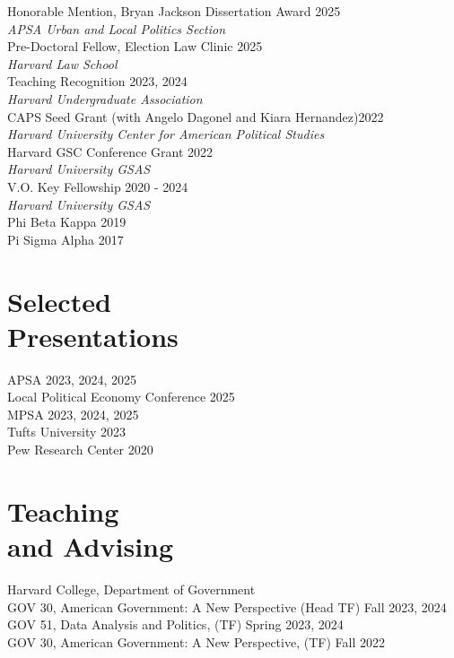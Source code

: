 \documentclass[margin, line]{res}
\begin{document}
\begin{resume}
Honorable Mention, Bryan Jackson Dissertation Award \hfill 2025\\
\hspace*{5mm} \textit{APSA Urban and Local Politics Section} \\
Pre-Doctoral Fellow, Election Law Clinic \hfill 2025\\
\hspace*{5mm} \textit{Harvard Law School}\\
Teaching Recognition \hfill 2023, 2024\\
\hspace*{5mm} \textit{Harvard Undergraduate Association}\\
CAPS Seed Grant (with Angelo Dagonel and Kiara Hernandez)\hfill 2022\\
\hspace*{5mm} \textit{Harvard University Center for American Political Studies}\\
Harvard GSC Conference Grant \hfill 2022\\
\hspace*{5mm} \textit{Harvard University GSAS}\\
V.O. Key Fellowship \hfill 2020 - 2024\\
\hspace*{5mm} \textit{Harvard University GSAS}\\
Phi Beta Kappa \hfill 2019\\
Pi Sigma Alpha \hfill 2017

\section{Selected \\Presentations}
APSA \hfill 2023, 2024, 2025\\
\hspace*{5mm} Local Political Economy Conference \hfill 2025\\
MPSA \hfill 2023, 2024, 2025\\
Tufts University \hfill 2023\\
Pew Research Center  \hfill 2020

\section{Teaching \\and Advising}
Harvard College, Department of Government\\
\hspace*{5mm} GOV 30, American Government: A New Perspective (Head TF) \hfill Fall 2023, 2024\\
\hspace*{5mm} GOV 51, Data Analysis and Politics, (TF) \hfill Spring 2023, 2024\\
\hspace*{5mm} GOV 30, American Government: A New Perspective,  (TF) \hfill Fall 2022


\end{resume}
\end{document}
